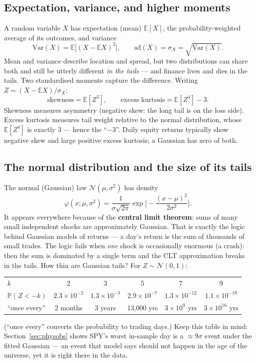 \documentclass[11pt,a4paper]{article}
\newcommand{\E}{\mathbb{E}}
\newcommand{\Prob}{\mathbb{P}}
\newcommand{\Var}{\mathrm{Var}}
\newcommand{\N}{\mathcal{N}}
\begin{document}
\subsection{Expectation, variance, and higher moments}
A random variable $X$ has expectation (mean) $\E[X]$, the probability-weighted
average of its outcomes, and variance
\begin{equation}
\Var(X)=\E\big[(X-\E X)^2\big],\qquad \text{sd}(X)=\sigma_X=\sqrt{\Var(X)} .
\end{equation}
Mean and variance describe location and spread, but two distributions can share
both and still be utterly different \emph{in the tails} --- and finance lives and
dies in the tails. Two standardised moments capture the difference. Writing
$Z=(X-\E X)/\sigma_X$:
\begin{equation}
\text{skewness}=\E[Z^3],\qquad
\text{excess kurtosis}=\E[Z^4]-3 .
\end{equation}
Skewness measures asymmetry (negative skew: the long tail is on the loss side).
Excess kurtosis measures tail weight relative to the normal distribution, whose
$\E[Z^4]$ is exactly 3 --- hence the ``$-3$''. Daily equity returns typically show
negative skew and large positive excess kurtosis; a Gaussian has zero of both.

\subsection{The normal distribution and the size of its tails}
The normal (Gaussian) law $\N(\mu,\sigma^2)$ has density
\begin{equation}
\varphi(x;\mu,\sigma^2)=\frac{1}{\sigma\sqrt{2\pi}}
\exp\!\Big[-\frac{(x-\mu)^2}{2\sigma^2}\Big].
\end{equation}
It appears everywhere because of the \textbf{central limit theorem}: sums of many
small independent shocks are approximately Gaussian. That is exactly the logic
behind Gaussian models of returns --- a day's return is the sum of thousands of
small trades. The logic fails when \emph{one} shock is occasionally enormous
(a crash): then the sum is dominated by a single term and the CLT approximation
breaks in the tails. How thin are Gaussian tails? For $Z\sim\N(0,1)$:
\begin{center}
\small
\begin{tabular}{lccccc}
\toprule
$k$ & 2 & 3 & 5 & 7 & 9\\
$\Prob(Z<-k)$ & $2.3\times10^{-2}$ & $1.3\times10^{-3}$ & $2.9\times10^{-7}$
& $1.3\times10^{-12}$ & $1.1\times10^{-19}$\\
``once every'' & 2 months & 3 years & 13{,}000 yrs & $3\times10^{9}$ yrs &
$3\times10^{16}$ yrs\\
\bottomrule
\end{tabular}
\end{center}
(``once every'' converts the probability to trading days.) Keep this table in
mind: Section~\ref{sec:physobs} shows SPY's worst in-sample day is a
$\approx\!9\sigma$ event under the fitted Gaussian --- an event that model says
should not happen in the age of the universe, yet it is right there in the data.
\end{document}
